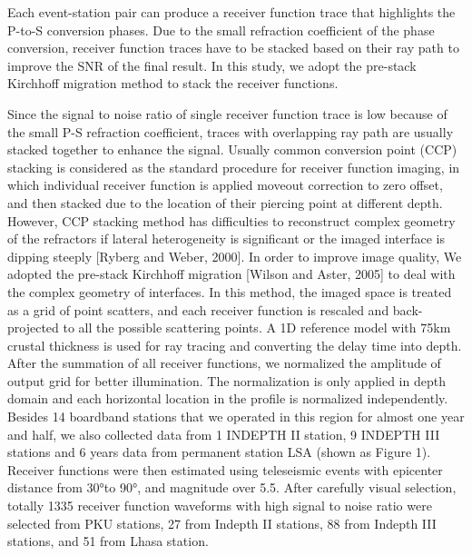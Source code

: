Each event-station pair can produce a receiver function trace that highlights the P-to-S conversion phases. Due to the small refraction coefficient of the phase conversion, receiver function traces have to be stacked based on their ray path to improve the SNR of the final result. In this study, we adopt the pre-stack Kirchhoff migration method \cite{Wilson_2005} to stack the receiver functions. 



Since the signal to noise ratio of single receiver function trace is low because of the small P-S refraction coefficient, traces with overlapping ray path are usually stacked together to enhance the signal. Usually common conversion point (CCP) stacking is considered as the standard procedure for receiver function imaging, in which individual receiver function is applied moveout correction to zero offset, and then stacked due to the location of their piercing point at different depth. However, CCP stacking method has difficulties to reconstruct complex geometry of the refractors if lateral heterogeneity is significant or the imaged interface is dipping steeply [Ryberg and Weber, 2000]. In order to improve image quality, We adopted the pre-stack Kirchhoff migration [Wilson and Aster, 2005] to deal with the complex geometry of interfaces. In this method, the imaged space is treated as a grid of point scatters, and each receiver function is rescaled and back-projected to all the possible scattering points. A 1D reference model with 75km crustal thickness is used for ray tracing and converting the delay time into depth. After the summation of all receiver functions, we normalized the amplitude of output grid for better illumination. The normalization is only applied in depth domain and each horizontal location in the profile is normalized independently. 
Besides 14 boardband stations that we operated in this region for almost one year and half, we also collected data from 1 INDEPTH II station, 9 INDEPTH III stations and 6 years data from permanent station LSA (shown as Figure 1). Receiver functions were then estimated using teleseismic events with epicenter distance from 30°to 90°, and magnitude over 5.5. After carefully visual selection, totally 1335 receiver function waveforms with high signal to noise ratio were selected from PKU stations, 27 from Indepth II stations, 88 from Indepth III stations, and 51 from Lhasa station.
